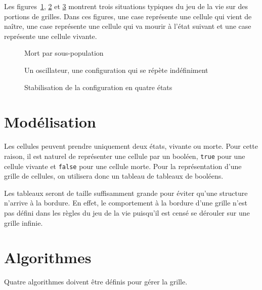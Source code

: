 Les figures~\ref{fig:life-ex-1}, \ref{fig:life-ex-2} et \ref{fig:life-ex-3} montrent
trois situations typiques du jeu de la vie sur des portions de grilles.
Dans ces figures, une case  représente
une cellule qui vient de naître, une case 
représente une cellule qui va mourir à l'état suivant et une case
 représente une cellule vivante.

\begin{figure}[p!]
    \centering
    
    \caption{Mort par sous-population}
    \label{fig:life-ex-1}
\end{figure}

\begin{figure}[p!]
    \centering
    
    \caption{Un oscillateur, une configuration qui se répète indéfiniment}
    \label{fig:life-ex-2}
\end{figure}

\begin{figure}[p!]
    \centering
    
    \caption{Stabilisation de la configuration en quatre états}
    \label{fig:life-ex-3}
\end{figure}

\section{Modélisation}

Les cellules peuvent prendre uniquement deux états, vivante ou
morte. Pour cette raison, il est naturel de représenter une
cellule par un booléen, \texttt{true} pour une cellule
vivante et \texttt{false} pour une cellule morte.
Pour la représentation d'une grille de cellules, on utilisera donc
un tableau de tableaux de booléens.

Les tableaux seront de taille suffisamment grande pour éviter qu'une
structure n'arrive à la bordure. En effet, le comportement à la bordure
d'une grille n'est pas défini dans les règles du jeu de la vie puisqu'il
est censé se dérouler sur une grille infinie.

\section{Algorithmes}

Quatre algorithmes doivent être définis pour gérer la grille.

